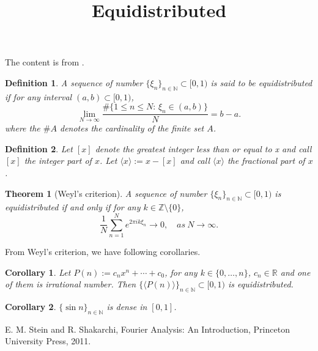 \documentclass[a4paper,12pt]{article}
\title{Equidistributed}
\author{}
\date{}
\newtheorem{theorem}{Theorem}
\newtheorem{definition}{Definition}
\newtheorem{corollary}{Corollary}
\begin{document}
\maketitle

The content is from \cite[Chapter 4, Section 2]{ss11}.

\begin{definition}
    A sequence of number $ \{ \xi_n \}_{n \in \mathbb{N}} \subset [0, 1) $ is said to be equidistributed 
    if for any interval $ (a, b) \subset [0, 1) $, 
    $$ 
        \lim_{N \to \infty} \frac{ \# \{1 \leq n \leq N: \, \xi_n \in (a, b) \}}{N} = b - a. 
    $$
where the $ \# A $ denotes the cardinality of the finite set $ A $.
\end{definition}

\begin{definition}
    Let $ [x] $ denote the greatest integer less than or equal to x and call $ [x] $ the integer part of $ x $.
    Let $ \langle x \rangle := x - [x] $ and call $ \langle x \rangle $ the fractional part of $ x $.
\end{definition}

\begin{theorem}[Weyl's criterion]
    A sequence of number $ \{ \xi_n \}_{n \in \mathbb{N}} \subset [0, 1) $ is equidistributed 
    if and only if for any $ k \in \mathbb{Z} \setminus \{0\} $,
    $$ 
        \frac{1}{N}\sum_{n=1}^N e^{2 \pi i k \xi_{n}} \to 0, \quad as \ N \to \infty. 
    $$
\end{theorem}

From Weyl's criterion, we have following corollaries.

\begin{corollary}
    Let $ P(n) := c_n x^n + \cdots + c_0 $, for any $ k \in \{0, \ldots, n\} $, $ c_n \in \mathbb{R} $
    and one of them is irrational number. Then $ \{ \langle P(n) \rangle \}_{n \in \mathbb{N}} \subset [0, 1) $ is equidistributed.
\end{corollary}

\begin{corollary}
    $ \{ \sin n \}_{n \in \mathbb{N}} $ is dense in $ [0, 1] $.
\end{corollary}

\begin{thebibliography}{99}

     E. M. Stein and R. Shakarchi, Fourier Analysis: An Introduction, Princeton University Press, 2011.
    
\end{thebibliography}
\end{document}
